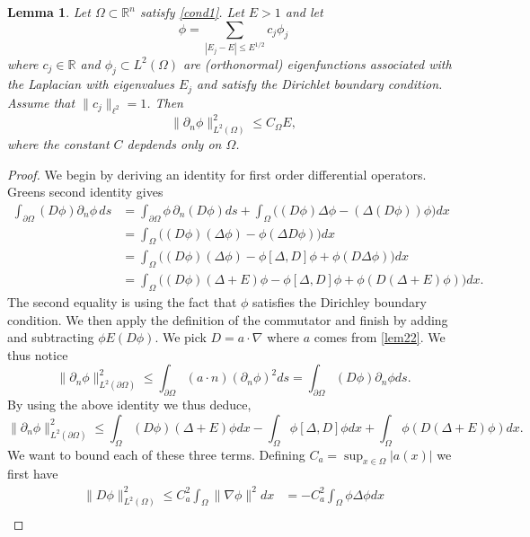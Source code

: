 \documentclass{article}
\newcommand{\R}{\mathbb{R}}
\newtheorem{lemma}{Lemma}\newcommand{\lemmaautorefname}{Lemma}
\begin{document}
\begin{lemma}
\label{lem21}
Let $\Omega \subset \R^n$ satisfy \autoref{cond1}.
Let $E > 1$ and let
\[
\phi = \sum_{|E_j - E| \le E^{1/2}} c_j \phi_j
\]
where $c_j \in \R$ and $\phi_j \subset L^2(\Omega)$ are (orthonormal) eigenfunctions associated with the Laplacian with eigenvalues $E_j$ and satisfy the Dirichlet boundary condition.
Assume that $\lVert c_j \rVert_{\ell^2} = 1$.
Then
\[
\lVert \partial_n \phi\rVert_{L^2(\Omega)}^2 \le C_\Omega E,
\]
where the constant $C$ depdends only on $\Omega$.
\end{lemma}
\begin{proof}
We begin by deriving an identity for first order differential operators.
Greens second identity gives
\begin{align*}
\int_{\partial \Omega} (D \phi) \partial_n \phi \, ds
& = \int_{\partial \Omega} \phi \, \partial_n (D \phi) ds + \int_{\Omega}  \Big((D \phi)\Delta \phi - (\Delta (D \phi)) \phi \Big) dx \\
& = \int_{\Omega} \Big((D \phi)(\Delta \phi) - \phi (\Delta D \phi)\Big) dx \\
& = \int_{\Omega} \Big((D \phi) (\Delta \phi) - \phi [\Delta, D] \phi + \phi (D \Delta \phi) \Big) dx \\
& = \int_{\Omega} \Big((D \phi) (\Delta + E) \phi - \phi [\Delta, D] \phi + \phi (D (\Delta + E) \phi) \Big) dx.
\end{align*}
The second equality is using the fact that $\phi$ satisfies the Dirichley boundary condition.
We then apply the definition of the commutator and finish by adding and subtracting $\phi E (D \phi)$.
We pick $D = a \cdot \nabla$ where $a$ comes from \autoref{lem22}.
We thus notice
\[
\lVert \partial_n \phi \rVert_{L^2(\partial \Omega)}^2
\le \int_{\partial \Omega} (a \cdot n) (\partial_n \phi)^2 ds
= \int_{\partial \Omega} (D \phi) \partial_n \phi ds.
\]
By using the above identity we thus deduce,
\begin{equation}
\label{eq-3terms}
\lVert \partial_n \phi \rVert_{L^2(\partial \Omega)}^2 \le \int_{\Omega} (D \phi) (\Delta + E) \phi dx - \int_{\Omega} \phi [\Delta, D] \phi dx + \int_{\Omega} \phi (D (\Delta + E) \phi) dx.
\end{equation}
We want to bound each of these three terms.
Defining $C_a = \sup_{x \in \Omega} |a(x)|$ we first have
\begin{align*}
\lVert D \phi \rVert_{L^2(\Omega)}^2 \le C_a^2 \int_{\Omega} \lVert \nabla \phi\rVert^2 dx & = - C_a^2 \int_{\Omega} \phi \Delta \phi dx \\

\end{align*}
\end{proof}
\end{document}
